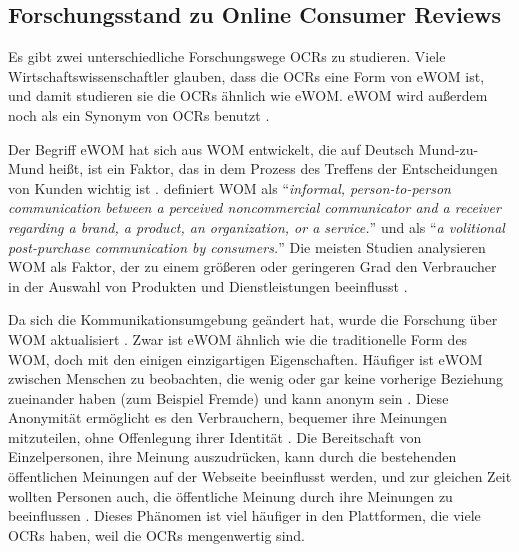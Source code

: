 \subsection{Forschungsstand zu Online Consumer Reviews}
Es gibt zwei unterschiedliche Forschungswege \ac{OCRs} zu studieren. Viele Wirtschaftswissenschaftler glauben, dass die \ac{OCRs} eine Form von \ac{eWOM} ist, und damit studieren sie die \ac{OCRs} ähnlich wie \ac{eWOM}. \ac{eWOM} wird außerdem noch als ein Synonym von \ac{OCRs} benutzt \citep{SerraCantallops2014}.


Der Begriff \ac{eWOM} hat sich aus \ac{WOM} entwickelt, die auf Deutsch Mund-zu-Mund heißt, ist ein Faktor, das in dem Prozess des Treffens der Entscheidungen von Kunden wichtig ist \citep{SerraCantallops2014}. \citet{harrison2001measurement} definiert \ac{WOM} als ``\emph{informal, person-to-person communication between a perceived noncommercial communicator and a receiver regarding a brand, a product, an organization, or a service.}'' und \citet{dick1994customer} als ``\emph{a volitional post-purchase communication by consumers.}'' Die meisten Studien analysieren WOM als Faktor, der zu einem größeren oder geringeren Grad den Verbraucher in der Auswahl von Produkten und Dienstleistungen beeinflusst \citep{SerraCantallops2014}.

Da sich die Kommunikationsumgebung geändert hat, wurde die Forschung über \ac{WOM} aktualisiert \citep{Vilpponen2006}. Zwar ist \ac{eWOM} ähnlich wie die traditionelle Form des \ac{WOM}, doch mit den einigen einzigartigen Eigenschaften. Häufiger ist \ac{eWOM} zwischen Menschen zu beobachten, die wenig oder gar keine vorherige Beziehung zueinander haben (zum Beispiel Fremde) und kann anonym sein \citep{Dellarocas2003, goldsmith2006measuring, sen2007you}. Diese Anonymität ermöglicht es den Verbrauchern, bequemer ihre Meinungen mitzuteilen, ohne Offenlegung ihrer Identität \citep{goldsmith2006measuring}. Die Bereitschaft von Einzelpersonen, ihre Meinung auszudrücken, kann durch die bestehenden öffentlichen Meinungen auf der Webseite beeinflusst werden, und zur gleichen Zeit wollten Personen auch, die öffentliche Meinung durch ihre Meinungen zu beeinflussen \citep{Hong2011}. Dieses Phänomen ist viel häufiger in den Plattformen, die viele \ac{OCRs} haben, weil die \ac{OCRs} mengenwertig sind.


